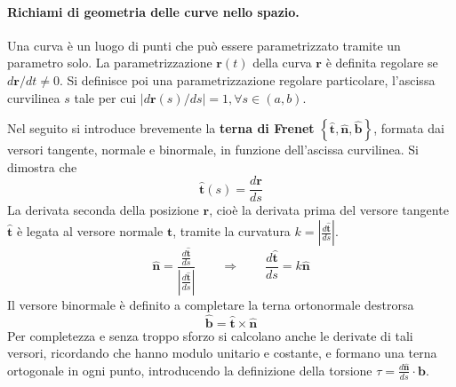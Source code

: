\paragraph{Richiami di geometria delle curve nello spazio.}
Una curva è un luogo di punti che può essere parametrizzato tramite un
 parametro solo.
La parametrizzazione $\bm{r}(t)$ della curva $\bm{r}$ è definita regolare 
 se $d\bm{r}/dt \ne 0$. Si definisce poi una parametrizzazione regolare
 particolare, l'ascissa curvilinea $s$ tale per cui $\left| d\bm{r}(s)/ds
 \right| = 1, \forall s \in (a,b)$.

\noindent 
Nel seguito si introduce brevemente la \textbf{terna di Frenet} 
 $\left\{\bm{\hat{t}}, \bm{\hat{n}}, \bm{\hat{b}} \right\}$, formata
 dai versori tangente, normale e binormale, in funzione dell'ascissa
 curvilinea.
%
Si dimostra che
\begin{equation}
 \bm{\hat{t}}(s) = \dfrac{d\bm{r}}{ds}
\end{equation}
%
La derivata seconda della posizione $\bm{r}$, cioè la derivata prima del
 versore tangente $\bm{\hat{t}}$ è legata al versore normale
 $\bm{\hat{t}}$, tramite la curvatura $k = \left| \frac{d\bm{\hat{t}}}{
 ds} \right|$.
\begin{equation}
 \bm{\hat{n}} = \dfrac{\frac{d\bm{\hat{t}}}{ds}}
    {\left|\frac{d\bm{\hat{t}}}{ds} \right|} 
  \qquad \Rightarrow \qquad
 \dfrac{d\bm{\hat{t}}}{ds} = k \bm{\hat{n}}
\end{equation}
%
Il versore binormale è definito a completare la terna ortonormale 
 destrorsa
\begin{equation}
 \bm{\hat{b}} = \bm{\hat{t}} \times \bm{\hat{n}} 
\end{equation}
%
Per completezza e senza troppo sforzo si calcolano anche le derivate 
 di tali versori, ricordando che hanno modulo unitario e costante,
 e formano una terna ortogonale in ogni punto, introducendo la definizione
 della torsione $\tau = \frac{d \bm{\hat{n}}}{ds}\cdot \bm{b}$.
